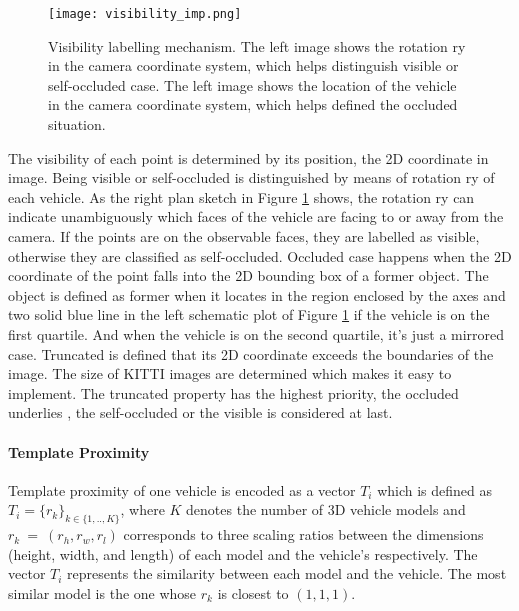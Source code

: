 \begin{figure}[h]		
	\texttt{[image: visibility\_imp.png]}
	\caption{Visibility labelling mechanism. The left image shows the rotation ry in the camera coordinate system, which helps distinguish visible or self-occluded case. The left image shows the location of the vehicle in the camera coordinate system, which helps defined the occluded situation.}
	\centering
	\label{visibility_imp}
\end{figure}

The visibility of each point is determined by its position, \ie the 2D coordinate in image.  Being visible or self-occluded is distinguished by means of rotation ry of each vehicle. As the right plan sketch in Figure \ref{visibility_imp} shows, the rotation ry can indicate unambiguously which faces of the vehicle are facing to or away from the camera. If the points are on the observable faces, they  are labelled as visible,  otherwise they are classified as self-occluded. Occluded case happens when the 2D coordinate of the point falls into the 2D bounding box of a former object. The object is defined as former when it locates in the region enclosed by the axes and two solid blue line in the left schematic plot of Figure \ref{visibility_imp} if the vehicle is on the first quartile.  And when the vehicle is on the second quartile, it's just a mirrored case. Truncated is defined that its 2D coordinate exceeds the boundaries of the image. The size of KITTI images are determined which makes it easy to implement. The truncated property has the highest priority, the occluded underlies , the self-occluded or the visible is considered at last.


\paragraph{Template Proximity}

Template proximity of one vehicle is encoded as a vector $\mathit{T_{i}}$ which is defined as $\mathit{T}_i = \{r_k\}_{k \in \{1,.., K\}}$, where $\mathit{K}$ denotes the number of 3D vehicle models and  $r_k~=~(r_h,r_w,r_l)$ corresponds to three scaling ratios between the dimensions (\ie height, width, and length) of each model and the vehicle's respectively. The vector $\mathit{T_{i}}$ represents the similarity between each model and the vehicle. The most similar model is the one whose $r_k$ is closest to $(1, 1, 1)$.

